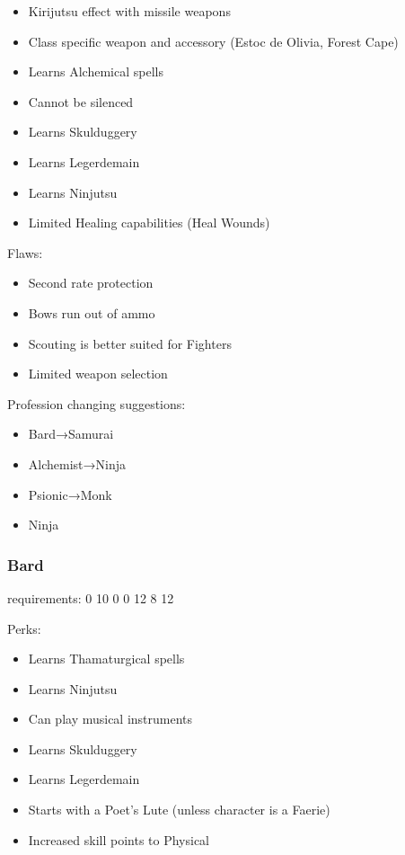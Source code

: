 \documentclass[12pt]{article}
\begin{document}
\begin{itemize}
\item
  Kirijutsu effect with missile weapons
\item
  Class specific weapon and accessory (Estoc de Olivia, Forest Cape)
\item
  Learns Alchemical spells
\item
  Cannot be silenced
\item
  Learns Skulduggery
\item
  Learns Legerdemain
\item
  Learns Ninjutsu
\item
  Limited Healing capabilities (Heal Wounds)
\end{itemize}

Flaws:

\begin{itemize}
\item
  Second rate protection
\item
  Bows run out of ammo
\item
  Scouting is better suited for Fighters
\item
  Limited weapon selection
\end{itemize}

Profession changing suggestions:

\begin{itemize}
\item
  Bard→Samurai
\item
  Alchemist→Ninja
\item
  Psionic→Monk
\item
  Ninja
\end{itemize}

\subsubsection{Bard}\label{bard}

requirements: 0 10 0 0 12 8 12

Perks:

\begin{itemize}
\item
  Learns Thamaturgical spells
\item
  Learns Ninjutsu
\item
  Can play musical instruments
\item
  Learns Skulduggery
\item
  Learns Legerdemain
\item
  Starts with a Poet's Lute (unless character is a Faerie)
\item
  Increased skill points to Physical
\end{itemize}
\end{document}
